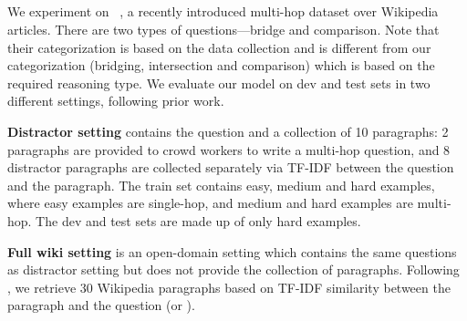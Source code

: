 
\subsection{\hotpot}

We experiment on \hotpot{}~\citep{hotpot}, a recently introduced multi-hop \RC{} dataset over Wikipedia articles. There are two types of questions---bridge and comparison. Note that their categorization is based on the data collection and is different from our categorization (bridging, intersection and comparison) which is based on the required reasoning type. 
We evaluate our model on dev and test sets in two different settings, following prior work.

\vspace{.1cm}
\noindent \textbf{Distractor setting} contains the question and a collection of 10 paragraphs: 2 paragraphs are provided to crowd workers to write a multi-hop question, and 8 distractor paragraphs are collected separately via TF-IDF between the question and the paragraph.
The train set contains easy, medium and hard examples, where easy examples are single-hop, and medium and hard examples are multi-hop. The dev and test sets are made up of only hard examples.

\vspace{.1cm}
\noindent \textbf{Full wiki setting} is an open-domain setting which contains the same questions as distractor setting but does not provide the collection of paragraphs.
Following \citet{squad-open}, we retrieve 30 Wikipedia paragraphs based on TF-IDF similarity between the paragraph and the question (or \query).

